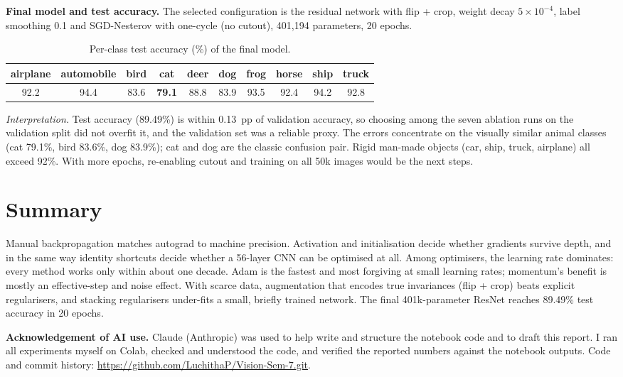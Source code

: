 \documentclass[10pt,a4paper]{article}
\newcommand{\githuburl}{https://github.com/LuchithaP/Vision-Sem-7.git}
\begin{document}
\textbf{Final model and test accuracy.} The selected configuration is the residual network with flip + crop, weight decay
$5\times10^{-4}$, label smoothing 0.1 and SGD-Nesterov with one-cycle (no cutout), 401{,}194 parameters, 20 epochs.
\begin{center}
\end{center}
\begin{table}[H]\centering\small
\caption{Per-class test accuracy (\%) of the final model.}
\begin{tabular}{cccccccccc}
\toprule
airplane & automobile & bird & cat & deer & dog & frog & horse & ship & truck\\
\midrule
92.2 & 94.4 & 83.6 & \textbf{79.1} & 88.8 & 83.9 & 93.5 & 92.4 & 94.2 & 92.8\\
\bottomrule
\end{tabular}
\end{table}
\textit{Interpretation.} Test accuracy (89.49\%) is within 0.13~pp of validation accuracy, so choosing among the seven ablation runs
on the validation split did not overfit it, and the validation set was a reliable proxy. The errors concentrate on the visually
similar animal classes (cat 79.1\%, bird 83.6\%, dog 83.9\%); cat and dog are the classic confusion pair. Rigid man-made objects (car,
ship, truck, airplane) all exceed 92\%. With more epochs, re-enabling cutout and training on all 50k images would be the next steps.

\section*{Summary}
Manual backpropagation matches autograd to machine precision. Activation and initialisation decide whether gradients survive depth,
and in the same way identity shortcuts decide whether a 56-layer CNN can be optimised at all. Among optimisers, the learning rate
dominates: every method works only within about one decade. Adam is the fastest and most forgiving at small learning rates;
momentum's benefit is mostly an effective-step and noise effect. With scarce data, augmentation that encodes true invariances
(flip + crop) beats explicit regularisers, and stacking regularisers under-fits a small, briefly trained network. The final 401k-parameter
ResNet reaches 89.49\% test accuracy in 20 epochs.

\textbf{Acknowledgement of AI use.} Claude (Anthropic) was used to help write and structure the notebook code and to draft this
report. I ran all experiments myself on Colab, checked and understood the code, and verified the reported numbers against the
notebook outputs. Code and commit history: \url{\githuburl}.
\end{document}
